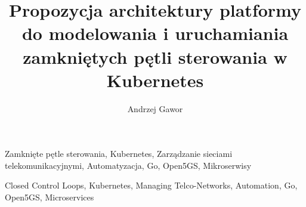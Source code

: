 \documentclass[
    bindingoffset=5mm,  %
    footnoteindent=3mm, %
    hyphenation=true    %
]{src/wut-thesis}
\begin{document}
\title{
    Propozycja architektury platformy do modelowania i uruchamiania zamkniętych pętli sterowania w Kubernetes
}
\author{Andrzej Gawor}
\date{\the\year}
\maketitle

\cleardoublepage
\abstract

\keywords Zamknięte pętle sterowania, Kubernetes, Zarządzanie sieciami telekomunikacyjnymi, Automatyzacja, Go, Open5GS, Mikroserwisy

\clearpage
\secondabstract

\secondkeywords Closed Control Loops, Kubernetes, Managing Telco-Networks, Automation, Go, Open5GS, Microservices

\pagestyle{plain}

\cleardoublepage
\tableofcontents

\cleardoublepage 
\pagestyle{headings}







\cleardoublepage 
\printbibliography



\newpage
\pagestyle{plain}


\listoffigurestoc    
\vspace{1cm}         
\listoftablestoc     
\vspace{1cm}         
\listofappendicestoc 

\setcounter{tocdepth}{1}

\end{document}
